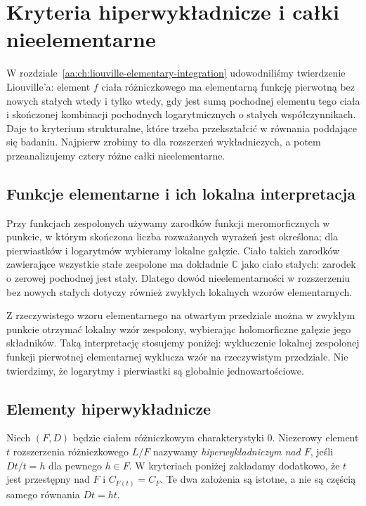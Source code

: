 \chapter{Kryteria hiperwykładnicze i całki nieelementarne}
\label{aa:ch:nonelementary-integrals}

W rozdziale~\ref{aa:ch:liouville-elementary-integration}
udowodniliśmy twierdzenie Liouville'a: element $f$ ciała
różniczkowego ma elementarną funkcję pierwotną bez nowych stałych
wtedy i tylko wtedy, gdy jest sumą pochodnej elementu tego ciała
i skończonej kombinacji pochodnych logarytmicznych
o stałych współczynnikach. Daje to kryterium strukturalne,
które trzeba przekształcić w równania poddające się badaniu.
Najpierw zrobimy to dla rozszerzeń wykładniczych,
a potem przeanalizujemy cztery różne całki nieelementarne.

\section{Funkcje elementarne i ich lokalna interpretacja}

Przy funkcjach zespolonych używamy zarodków funkcji
meromorficznych w punkcie, w którym skończona liczba
rozważanych wyrażeń jest określona; dla pierwiastków
i logarytmów wybieramy lokalne gałęzie. Ciało takich
zarodków zawierające wszystkie stałe zespolone ma
dokładnie $\mathbb C$ jako ciało stałych:
zarodek o zerowej pochodnej jest stały.
Dlatego dowód nieelementarności w rozszerzeniu
bez nowych stałych dotyczy również zwykłych
lokalnych wzorów elementarnych.

Z rzeczywistego wzoru elementarnego na otwartym
przedziale można w zwykłym punkcie otrzymać
lokalny wzór zespolony, wybierając holomorficzne
gałęzie jego składników. Taką interpretację
stosujemy poniżej: wykluczenie lokalnej
zespolonej funkcji pierwotnej elementarnej
wyklucza wzór na rzeczywistym przedziale.
Nie twierdzimy, że logarytmy i pierwiastki
są globalnie jednowartościowe.

\section{Elementy hiperwykładnicze}

\begin{definicja}
\label{aa:def:hyperexponential}
Niech $(F,D)$ będzie ciałem różniczkowym
charakterystyki $0$. Niezerowy element $t$
rozszerzenia różniczkowego $L/F$ nazywamy
\emph{hiperwykładniczym nad $F$}, jeśli
$Dt/t=h$ dla pewnego $h\in F$.
W kryteriach poniżej zakładamy dodatkowo,
że $t$ jest przestępny nad $F$ i
$C_{F(t)}=C_F$. Te dwa założenia są
istotne, a nie są częścią samego równania $Dt=ht$.
\end{definicja}

